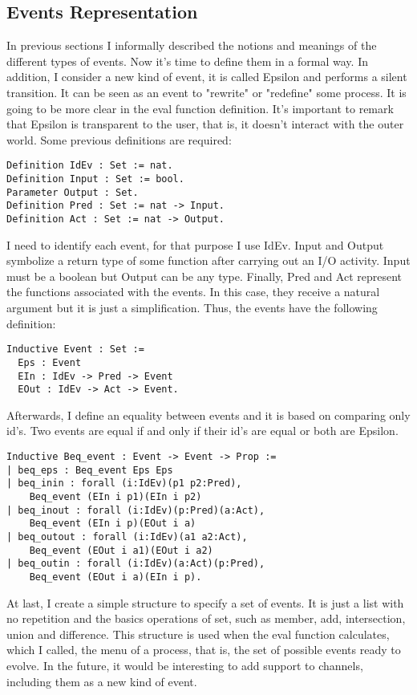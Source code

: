 \documentclass{comjnl}
\begin{document}
\subsection{Events Representation}
In previous sections I informally described the notions and meanings of the different types of events. Now it's time to define them in a formal way. In addition, I consider a new kind of event, it is called Epsilon and performs a silent transition. It can be seen as an event to "rewrite" or "redefine" some process. It is going to be more clear in the eval function definition. It's important to remark that Epsilon is transparent to the user, that is, it doesn't interact with the outer world.
Some previous definitions are required:
\begin{verbatim}
Definition IdEv : Set := nat.
Definition Input : Set := bool.
Parameter Output : Set.
Definition Pred : Set := nat -> Input.
Definition Act : Set := nat -> Output.
\end{verbatim}
I need to identify each event, for that purpose I use IdEv. Input and Output symbolize a return type of some function after carrying out an I/O activity. Input must be a boolean but Output can be any type. Finally, Pred and Act represent the functions associated with the events. In this case, they receive a natural argument but it is just a simplification. Thus, the events have the following definition:
\begin{verbatim}
Inductive Event : Set :=
  Eps : Event
  EIn : IdEv -> Pred -> Event
  EOut : IdEv -> Act -> Event.
\end{verbatim} 
 Afterwards, I define an equality between events and it is based on comparing only id's. Two events are equal if and only if their id's are equal or both are Epsilon.  \\
\begin{verbatim}
Inductive Beq_event : Event -> Event -> Prop :=
| beq_eps : Beq_event Eps Eps
| beq_inin : forall (i:IdEv)(p1 p2:Pred), 
    Beq_event (EIn i p1)(EIn i p2) 
| beq_inout : forall (i:IdEv)(p:Pred)(a:Act), 
    Beq_event (EIn i p)(EOut i a) 
| beq_outout : forall (i:IdEv)(a1 a2:Act), 
    Beq_event (EOut i a1)(EOut i a2)
| beq_outin : forall (i:IdEv)(a:Act)(p:Pred), 
    Beq_event (EOut i a)(EIn i p).
\end{verbatim}
At last, I create a simple structure to specify a set of events. It is just a list with no repetition and the basics operations of set, such as member, add, intersection, union and difference. This structure is used when the eval function calculates, which I called, the menu of a process, that is, the set of possible events ready to evolve.
In the future, it would be interesting to add support to channels, including them as a new kind of event.  
\end{document}
